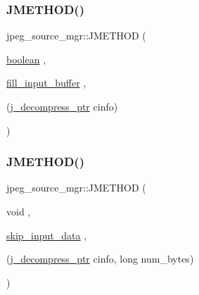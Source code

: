 \subsubsection{\texorpdfstring{JMETHOD()}{JMETHOD()}\hspace{0.1cm}{\footnotesize\ttfamily [2/5]}}
{\footnotesize\ttfamily jpeg\+\_\+source\+\_\+mgr\+::\+J\+M\+E\+T\+H\+OD (\begin{DoxyParamCaption}\item[{\mbox{\hyperlink{jmorecfg_8h_a7c6368b321bd9acd0149b030bb8275ed}{boolean}}}]{,  }\item[{\mbox{\hyperlink{jdatasrc_8c_aa3542f61993ed4a526694556fac65941}{fill\+\_\+input\+\_\+buffer}}}]{,  }\item[{(\mbox{\hyperlink{jpeglib_8h_a00c7d78af44bd26a901c791ccfc1e178}{j\+\_\+decompress\+\_\+ptr}} cinfo)}]{ }\end{DoxyParamCaption})}

\mbox{\label{structjpeg__source__mgr_a3e29df8ddadb0c15e54b69b5a7a10305}} 
\subsubsection{\texorpdfstring{JMETHOD()}{JMETHOD()}\hspace{0.1cm}{\footnotesize\ttfamily [3/5]}}
{\footnotesize\ttfamily jpeg\+\_\+source\+\_\+mgr\+::\+J\+M\+E\+T\+H\+OD (\begin{DoxyParamCaption}\item[{void}]{,  }\item[{\mbox{\hyperlink{jdatasrc_8c_ae539a6d1c36b54a0ef6168fecdc8379e}{skip\+\_\+input\+\_\+data}}}]{,  }\item[{(\mbox{\hyperlink{jpeglib_8h_a00c7d78af44bd26a901c791ccfc1e178}{j\+\_\+decompress\+\_\+ptr}} cinfo, long num\+\_\+bytes)}]{ }\end{DoxyParamCaption})}

\mbox{\label{structjpeg__source__mgr_a60a35ccd1fb8d954f34c0cdbf29ac010}} 
